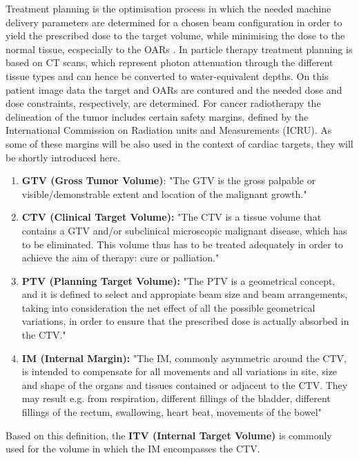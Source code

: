 \documentclass[type=dr, dr=rernat, accentcolor=tud7b,colorbacktitle, bigchapter, openright, twoside, 12pt ]{tudthesis}
\begin{document}
Treatment planning is the optimisation process in which the needed machine delivery parameters are determined for a chosen beam 
configuration in order to yield the prescribed dose to the target volume, while minimising the dose to the normal tissue, ecspecially 
to the OARs \cite{Ric12}. In particle therapy treatment planning is based on CT scans, which represent photon attenuation through 
the different tissue types and can hence be converted to water-equivalent depths. On this patient image data the target and OARs are 
contured and the needed dose and dose constraints, respectively, are determined. For cancer radiotherapy the delineation of the 
tumor includes certain safety margins, defined by the International Commission on Radiation units and Measurements (ICRU). As some 
of these margins will be also used in the context of cardiac targets, they will be shortly introduced here. 

\begin{enumerate}
 \item [] \textbf{GTV (Gross Tumor Volume)}: "The GTV is the gross palpable or visible/demonstrable extent and location of the malignant 
 growth." \cite{ICRU93a}
 \item [] \textbf{CTV (Clinical Target Volume):} "The CTV is a tissue volume that contains a GTV and/or subclinical microscopic malignant 
 disease, which has to be eliminated. This volume thus has to be treated adequately in order to achieve the aim of therapy: cure or 
 palliation." \cite{ICRU93a}
 \item[] \textbf{PTV (Planning Target Volume):} "The PTV is a geometrical concept, and it is defined to select and appropiate beam size 
 and beam arrangements, taking into consideration the net effect of all the possible geometrical variations, in order to ensure that the 
 prescribed dose is actually absorbed in the CTV." \cite{ICRU93a}
 \item[] \textbf{IM (Internal Margin):} "The IM, commonly asymmetric around the CTV, is intended to compensate for all movements and all 
 variations in site, size and shape of the organs and tissues contained or adjacent to the CTV. They may result e.g. from respiration, 
 different fillings of the bladder, different fillings of the rectum, swallowing, heart beat, movements of the bowel" \cite{ICRU99}
\end{enumerate}

Based on this definition, the \textbf{ITV (Internal Target Volume)} is commonly used for the volume in which the IM encompasses the CTV. 
\end{document}
